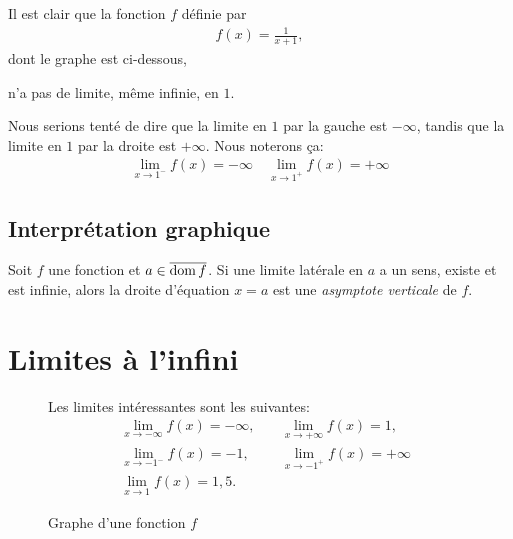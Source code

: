 \documentclass[main.tex]{subfiles}
\begin{document}
\begin{example}

    Il est clair que la fonction $f$ définie par
    \begin{align}
        f(x) = \frac 1 {x + 1},
    \end{align}
    dont le graphe est ci-dessous,
    \begin{center}
        \begin{plot}{0.5}{-6}{-6}{6}{6}
        \end{plot}
    \end{center}
    n'a pas de limite, même infinie, en $1$.

    Nous serions tenté de dire que la limite en $1$ par la gauche est $-\infty$,
    tandis que la limite en $1$ par la droite est $+\infty$.
    Nous noterons ça:
    \begin{align}
        \lim_{x \to 1^-} f(x) = -\infty
        \quad
        \lim_{x \to 1^+} f(x) = +\infty
    \end{align}
\end{example}

\subsection{Interprétation graphique}

\begin{definition}

    Soit $f$ une fonction et $a \in \overline{\operatorname{dom} f}$.
    Si une limite latérale en $a$ a un sens, existe et est infinie,
    alors la droite d'équation $x = a$ est
    une \emph{asymptote verticale} de $f$.
\end{definition}

\section{Limites à l'infini}

\begin{figure}
    \centering
    \begin{plot}{0.25}{-10}{-10}{10}{10}
    \end{plot}
    \caption{Graphe d'une fonction $f$}
    Les limites intéressantes sont les suivantes:
    \begin{align}
        &\lim_{x \to -\infty} f(x) = -\infty, \quad
        &\lim_{x \to +\infty} f(x) = 1,\\
        &\lim_{x \to -1^-} f(x) = -1, \quad
        &\lim_{x \to -1^+} f(x) = +\infty\\
        &\lim_{x \to 1} f(x) = 1,5.
    \end{align}
\end{figure}
\end{document}
